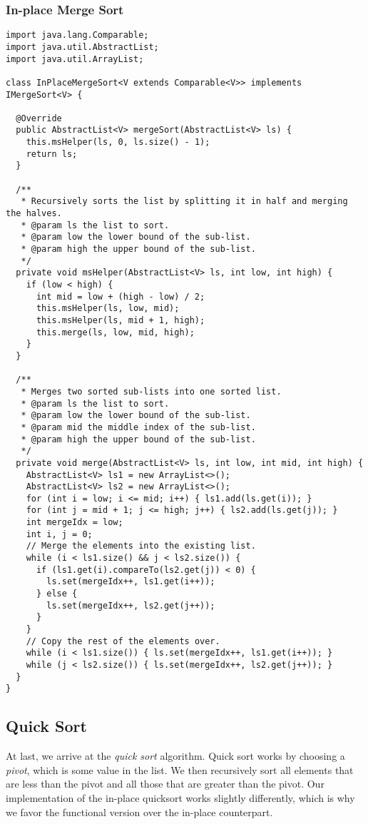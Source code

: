 \subsubsection*{In-place Merge Sort}
\begin{lstlisting}[language=MyJava]
import java.lang.Comparable;
import java.util.AbstractList;
import java.util.ArrayList;

class InPlaceMergeSort<V extends Comparable<V>> implements IMergeSort<V> {

  @Override
  public AbstractList<V> mergeSort(AbstractList<V> ls) {
    this.msHelper(ls, 0, ls.size() - 1);
    return ls;
  }

  /**
   * Recursively sorts the list by splitting it in half and merging the halves.
   * @param ls the list to sort.
   * @param low the lower bound of the sub-list. 
   * @param high the upper bound of the sub-list.
   */
  private void msHelper(AbstractList<V> ls, int low, int high) {
    if (low < high) {
      int mid = low + (high - low) / 2;
      this.msHelper(ls, low, mid);
      this.msHelper(ls, mid + 1, high);
      this.merge(ls, low, mid, high);
    }
  }

  /**
   * Merges two sorted sub-lists into one sorted list. 
   * @param ls the list to sort.
   * @param low the lower bound of the sub-list.
   * @param mid the middle index of the sub-list.
   * @param high the upper bound of the sub-list.
   */
  private void merge(AbstractList<V> ls, int low, int mid, int high) {
    AbstractList<V> ls1 = new ArrayList<>();
    AbstractList<V> ls2 = new ArrayList<>();
    for (int i = low; i <= mid; i++) { ls1.add(ls.get(i)); }
    for (int j = mid + 1; j <= high; j++) { ls2.add(ls.get(j)); }
    int mergeIdx = low;
    int i, j = 0;
    // Merge the elements into the existing list.
    while (i < ls1.size() && j < ls2.size()) {
      if (ls1.get(i).compareTo(ls2.get(j)) < 0) { 
        ls.set(mergeIdx++, ls1.get(i++)); 
      } else { 
        ls.set(mergeIdx++, ls2.get(j++)); 
      }
    }
    // Copy the rest of the elements over.
    while (i < ls1.size()) { ls.set(mergeIdx++, ls1.get(i++)); }
    while (j < ls2.size()) { ls.set(mergeIdx++, ls2.get(j++)); }
  }
}
\end{lstlisting}

\newpage
\subsection{Quick Sort}
At last, we arrive at the \emph{quick sort} algorithm. 
Quick sort works by choosing a \emph{pivot}, which is some value in the list. 
We then recursively sort all elements that are less than the pivot and all those that are greater than the pivot. 
Our implementation of the in-place quicksort works slightly differently, which is why we favor the functional version over the in-place counterpart. 

